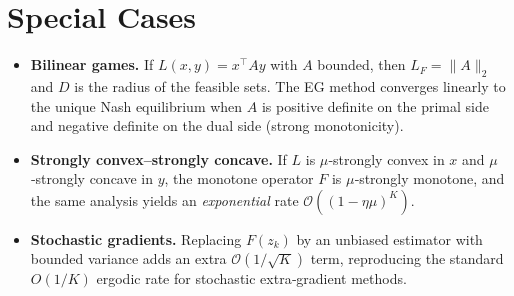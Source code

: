 \documentclass{article}
\begin{document}
\section*{Special Cases}
\begin{itemize}
\item \textbf{Bilinear games.} If $L(x,y)=x^{\top}Ay$ with $A$ bounded, then $L_{F}=\|A\|_{2}$ and $D$ is the radius of the feasible sets. The EG method converges linearly to the unique Nash equilibrium when $A$ is positive definite on the primal side and negative definite on the dual side (strong monotonicity).
\item \textbf{Strongly convex–strongly concave.} If $L$ is $\mu$‑strongly convex in $x$ and $\mu$‑strongly concave in $y$, the monotone operator $F$ is $\mu$‑strongly monotone, and the same analysis yields an \emph{exponential} rate $\mathcal{O}((1-\eta\mu)^{K})$.
\item \textbf{Stochastic gradients.} Replacing $F(z_{k})$ by an unbiased estimator with bounded variance adds an extra $\mathcal{O}(1/\sqrt{K})$ term, reproducing the standard $O(1/K)$ ergodic rate for stochastic extra‑gradient methods.
\end{itemize}
\end{document}
